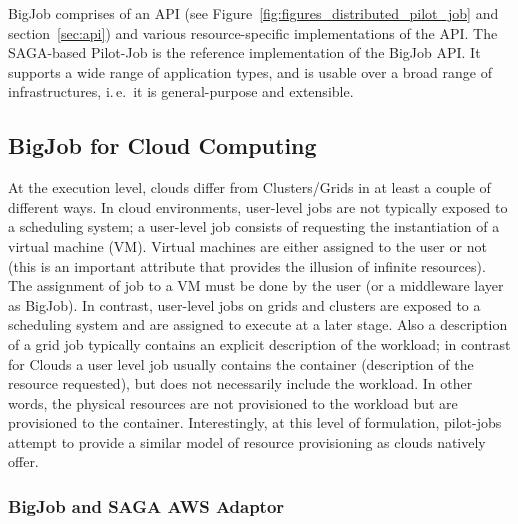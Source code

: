 \documentclass[]{article}
\begin{document}

BigJob comprises of an API (see Figure~\ref{fig:figures_distributed_pilot_job}
and section~\ref{sec:api}) and various resource-specific implementations of the
API. The SAGA-based Pilot-Job is the reference implementation of the BigJob API.
It supports a wide range of application types, and is usable over a broad range
of infrastructures, i.\,e.\ it is general-purpose and extensible.


\subsection{BigJob for Cloud Computing}

At the execution level, clouds differ from Clusters/Grids in at least a couple
of different ways. In cloud environments, user-level jobs are not typically
exposed to a scheduling system; a user-level job consists of requesting the
instantiation of a virtual machine (VM). Virtual machines are either assigned to
the user or not (this is an important attribute that provides the illusion of
infinite resources). The assignment of job to a VM must be done by the user (or
a middleware layer as BigJob). In contrast, user-level jobs on grids and 
clusters are exposed to a scheduling system and are
assigned to execute at a later stage. Also a description of a grid job typically
contains an explicit description of the workload; in contrast for Clouds a user
level job usually contains the container (description of the resource
requested), but does not necessarily include the workload. In other words, the
physical resources are not provisioned to the workload but are provisioned to
the container.  Interestingly, at this level of formulation, pilot-jobs attempt 
to provide a similar model of resource provisioning as clouds natively offer. 

\subsubsection{BigJob and SAGA AWS Adaptor}
\end{document}
